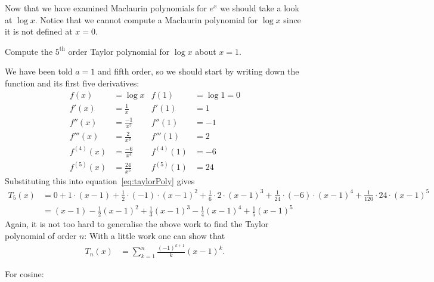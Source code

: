Now that we have examined Maclaurin polynomials for $e^x$ we should take a look at $\log
x$. Notice that we cannot compute a Maclaurin polynomial for $\log x$ since it is not
defined at $x=0$.
\begin{eg}\label{eg expand logx}
Compute the $5^\mathrm{th}$ order Taylor polynomial for $\log x$ about $x=1$.

\soln We have been told $a=1$ and fifth order, so we should start by writing down the
function and its first five derivatives:
\begin{align*}
  f(x) &= \log x & f(1) &= \log 1 = 0 \\
  f'(x) &= \frac{1}{x} & f'(1) &= 1 \\
  f''(x) &= \frac{-1}{x^2} & f''(1) &= -1 \\
  f'''(x) &= \frac{2}{x^3} & f'''(1) &= 2 \\
  f^{(4)}(x) &= \frac{-6}{x^4} & f^{(4)}(1) &= -6 \\
  f^{(5)}(x) &= \frac{24}{x^5} & f^{(5)}(1) &= 24
\end{align*}
Substituting this into equation~\eqref{eq:taylorPoly} gives
\begin{align*}
  T_5(x)&= 0 + 1\cdot (x-1)
  + \frac{1}{2} \cdot (-1) \cdot (x-1)^2
  + \frac{1}{6} \cdot 2 \cdot (x-1)^3
  + \frac{1}{24} \cdot (-6) \cdot (x-1)^4
  + \frac{1}{120} \cdot 24 \cdot (x-1)^5 \\
  &= (x-1) - \frac{1}{2}(x-1)^2 + \frac{1}{3}(x-1)^3 - \frac{1}{4}(x-1)^4 +
\frac{1}{5}(x-1)^5
\end{align*}
Again, it is not too hard to generalise the above work to find the Taylor polynomial of
order $n$:
With a little work one can show that
\begin{align*}
  T_n(x) &= \sum_{k=1}^n \frac{(-1)^{k+1}}{k} (x-1)^k.
\end{align*}
\end{eg}
For cosine:
